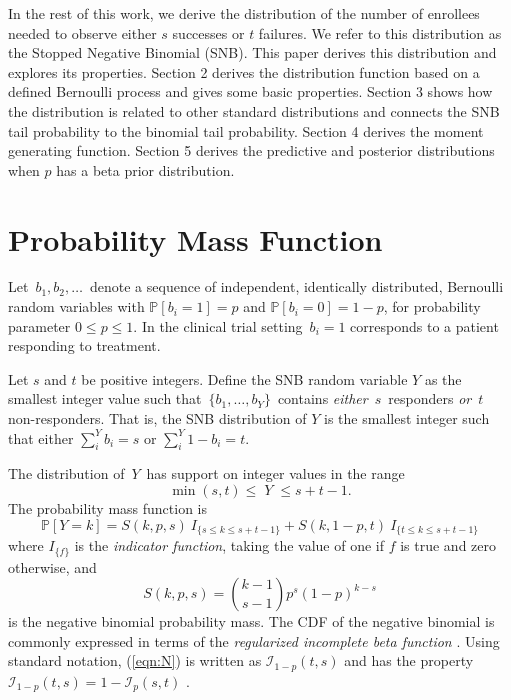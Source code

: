 \documentclass[12pt]{article}
\begin{document}
In the rest of this work, we derive the distribution of the number of 
enrollees needed
to observe either $s$ successes or $t$ failures. We refer to this distribution
as the Stopped Negative Binomial (SNB). 
This paper derives this distribution and explores its properties.
Section 2 derives the distribution function
based on a defined Bernoulli process and gives some basic properties.
Section 3 shows how the distribution is related to other standard
distributions and connects the SNB tail probability to the binomial tail 
probability.
Section 4 derives the moment generating function.
Section 5 derives the predictive and posterior distributions when $p$ has a 
beta prior distribution.

\section{Probability Mass Function}
\label{notation.section}

Let $\,b_1, b_2, \ldots \,$ denote a sequence of independent, identically
distributed, Bernoulli random variables with $\mathbb{P}[b_i=1]=p$ and
$\mathbb{P}[b_i = 0] = 1-p$, for
probability parameter $0\leq p \leq 1$. In the clinical trial setting
$\,b_i = 1$ corresponds to a patient responding to treatment.  

Let $s$ and $t$ be positive integers.  Define the SNB random
variable $Y$ as the smallest
integer value such that $\,\{b_1, \ldots , b_Y\}\,$ contains {\em either}
$\,s\,$ responders {\em or} $\,t\,$ non-responders. That is, the SNB 
distribution of $Y$ is the smallest integer such that either
$\sum_i^Y b_i = s$ or $\sum_i^Y 1-b_i = t$.

The distribution of $\,Y\,$ has support on integer values in the range
\begin{equation*}               
     \min(s,t) \leq \; Y \;\leq s+t-1  \label{range.y.eq}.
\end{equation*}
The probability mass function is
\begin{equation} \label{eqn:pmf}
\mathbb{P} [Y=k] = S(k, p, s) \ I_{\{s \leq k \leq s+t-1\}} + 
  S(k, 1-p, t) \ I_{\{ t \leq k \leq s+t-1 \}}
\end{equation}
where $I_{\{f\}}$ is the {\em indicator function}, taking the value 
of one if $f$ is true and zero otherwise, and
\begin{equation} \label{eqn:N}
S(k, p, s) = {k-1 \choose s-1} p^s (1-p)^{k-s} 
\end{equation}
is the negative binomial probability mass. 
The CDF of the negative binomial is commonly expressed in terms of the
{\em regularized incomplete beta function} \citep{Olver2010}. Using standard
notation, (\ref{eqn:N}) is written as $\mathcal{I}_{1-p}(t, s)$ and has
the property $\mathcal{I}_{1-p}(t, s) = 1 - \mathcal{I}_p(s, t)$
\citep{Uppuluri1967}.
\end{document}
